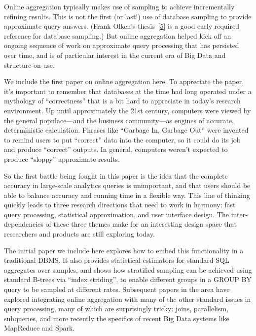\documentclass[b5paper,11pt,twoside,openright]{book}
\begin{document}
Online aggregation typically makes use of sampling to achieve
incrementally refining results. This is not the first (or last!) use of
database sampling to provide approximate query answers. (Frank Olken's
thesis~{{[}\protect\hyperlink{ref-olken-phd}{5}{]}} is a good early
required reference for database sampling.) But online aggregation helped
kick off an ongoing sequence of work on approximate query processing
that has persisted over time, and is of particular interest in the
current era of Big Data and structure-on-use.

We include the first paper on online aggregation here. To appreciate the
paper, it's important to remember that databases at the time had long
operated under a mythology of ``correctness'' that is a bit hard to
appreciate in today's research environment. Up until approximately the
21st century, computers were viewed by the general populace---and the
business community---as engines of accurate, deterministic calculation.
Phrases like ``Garbage In, Garbage Out'' were invented to remind users
to put ``correct'' data into the computer, so it could do its job and
produce ``correct'' outputs. In general, computers weren't expected to
produce ``sloppy'' approximate results.

So the first battle being fought in this paper is the idea that the
complete accuracy in large-scale analytics queries is unimportant, and
that users should be able to balance accuracy and running time in a
flexible way. This line of thinking quickly leads to three research
directions that need to work in harmony: fast query processing,
statistical approximation, and user interface design. The
inter-dependencies of these three themes make for an interesting design
space that researchers and products are still exploring today.

The initial paper we include here explores how to embed this
functionality in a traditional DBMS. It also provides statistical
estimators for standard SQL aggregates over samples, and shows how
stratified sampling can be achieved using standard B-trees via ``index
striding'', to enable different groups in a GROUP BY query to be sampled
at different rates. Subsequent papers in the area have explored
integrating online aggregation with many of the other standard issues in
query processing, many of which are surprisingly tricky: joins,
parallelism, subqueries, and more recently the specifics of recent Big
Data systems like MapReduce and Spark.
\end{document}
